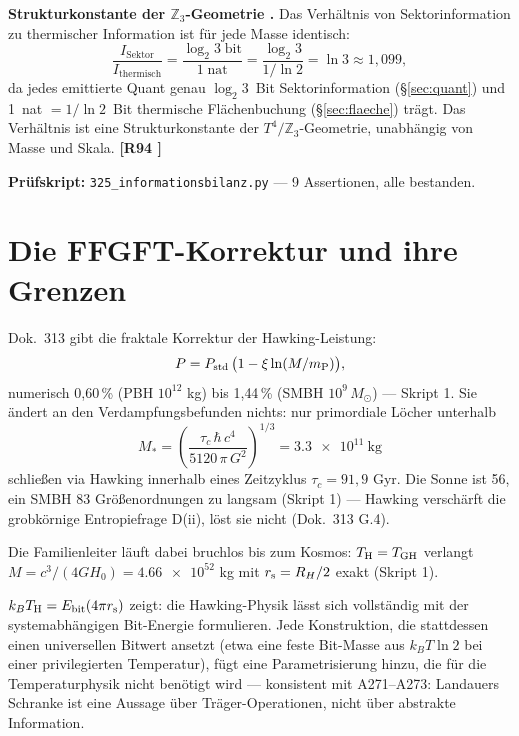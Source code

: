 \textbf{Strukturkonstante der $\mathbb{Z}_3$-Geometrie \B.}
Das Verhältnis von Sektorinformation zu thermischer Information ist
für jede Masse identisch:
\begin{equation}
  \frac{I_{\mathrm{Sektor}}}{I_{\mathrm{thermisch}}}
  = \frac{\log_2 3\;\text{bit}}{1\;\text{nat}}
  = \frac{\log_2 3}{1/\ln 2} = \ln 3 \approx 1{,}099,
\end{equation}
da jedes emittierte Quant genau $\log_2 3$~Bit Sektorinformation
(§\ref{sec:quant}) und 1~nat $= 1/\ln 2$~Bit thermische Flächenbuchung
(§\ref{sec:flaeche}) trägt.
Das Verhältnis ist eine Strukturkonstante der $T^4/\mathbb{Z}_3$-Geometrie,
unabhängig von Masse und Skala. \textbf{[R94 \B]}

\textbf{Prüfskript:} \texttt{325\_informationsbilanz.py} —
9 Assertionen, alle bestanden.

\section{Die FFGFT-Korrektur und ihre Grenzen}

Dok.\ 313 gibt die fraktale Korrektur der Hawking-Leistung:
\begin{equation}
  P = P_{\mathrm{std}}\,\bigl(1 - \xi\ln(M/m_{\mathrm{P}})\bigr),
\end{equation}
numerisch 0{,}60\,\% (PBH $10^{12}$ kg) bis 1{,}44\,\% (SMBH $10^9\,M_\odot$)
— Skript 1. Sie ändert an den Verdampfungsbefunden nichts:
nur primordiale Löcher unterhalb
\begin{equation}
  M_* = \left(\frac{\tau_c\,\hbar\,c^4}{5120\,\pi\,G^2}\right)^{1/3}
      = \num{3.3e11}\ \mathrm{kg}
\end{equation}
schließen via Hawking innerhalb eines Zeitzyklus $\tau_c = 91{,}9$ Gyr.
Die Sonne ist 56, ein SMBH 83 Größenordnungen zu langsam
(Skript 1) — Hawking verschärft die grobkörnige Entropiefrage
D(ii), löst sie nicht (Dok.\ 313 G.4). \K

Die Familienleiter läuft dabei bruchlos bis zum Kosmos:
$T_{\mathrm{H}} = T_{\mathrm{GH}}$ verlangt $M = c^3/(4GH_0) = \num{4.66e52}$ kg
mit $r_{\mathrm{s}} = R_H/2$ exakt (Skript 1). \K

\begin{tcolorbox}[warnbox, title={Einordnung des Bit-Befunds}]
  $k_BT_{\mathrm{H}} = E_{\mathrm{bit}}(4\pi r_{\mathrm{s}})$ zeigt: die Hawking-Physik lässt sich
  vollständig mit der systemabhängigen Bit-Energie formulieren.
  Jede Konstruktion, die stattdessen einen universellen Bitwert
  ansetzt (etwa eine feste Bit-Masse aus $k_B T\ln 2$ bei einer
  privilegierten Temperatur), fügt eine Parametrisierung hinzu,
  die für die Temperaturphysik nicht benötigt wird — konsistent
  mit A271–A273: Landauers Schranke ist eine Aussage über
  Träger-Operationen, nicht über abstrakte Information.
\end{tcolorbox}

